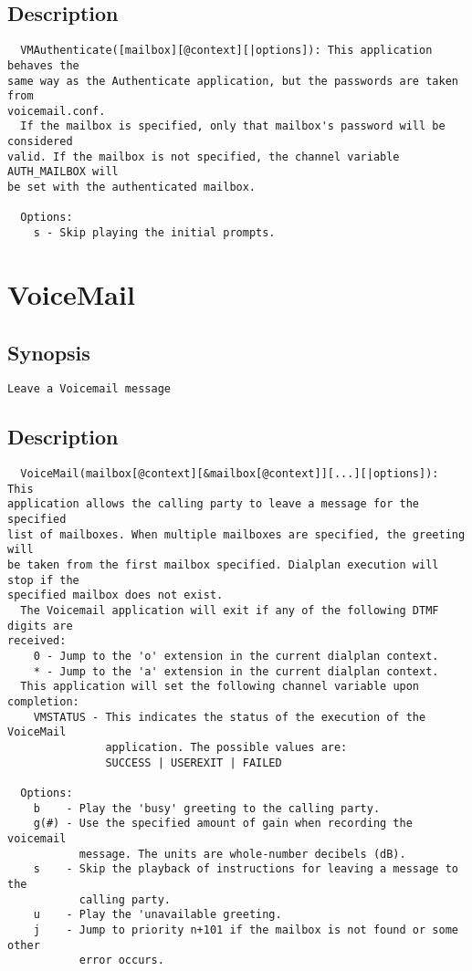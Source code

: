 \subsection{Description}
\begin{verbatim}
  VMAuthenticate([mailbox][@context][|options]): This application behaves the
same way as the Authenticate application, but the passwords are taken from
voicemail.conf.
  If the mailbox is specified, only that mailbox's password will be considered
valid. If the mailbox is not specified, the channel variable AUTH_MAILBOX will
be set with the authenticated mailbox.

  Options:
    s - Skip playing the initial prompts.

\end{verbatim}


\section{VoiceMail}
\subsection{Synopsis}
\begin{verbatim}
Leave a Voicemail message
\end{verbatim}
\subsection{Description}
\begin{verbatim}
  VoiceMail(mailbox[@context][&mailbox[@context]][...][|options]): This
application allows the calling party to leave a message for the specified
list of mailboxes. When multiple mailboxes are specified, the greeting will
be taken from the first mailbox specified. Dialplan execution will stop if the
specified mailbox does not exist.
  The Voicemail application will exit if any of the following DTMF digits are
received:
    0 - Jump to the 'o' extension in the current dialplan context.
    * - Jump to the 'a' extension in the current dialplan context.
  This application will set the following channel variable upon completion:
    VMSTATUS - This indicates the status of the execution of the VoiceMail
               application. The possible values are:
               SUCCESS | USEREXIT | FAILED

  Options:
    b    - Play the 'busy' greeting to the calling party.
    g(#) - Use the specified amount of gain when recording the voicemail
           message. The units are whole-number decibels (dB).
    s    - Skip the playback of instructions for leaving a message to the
           calling party.
    u    - Play the 'unavailable greeting.
    j    - Jump to priority n+101 if the mailbox is not found or some other
           error occurs.

\end{verbatim}


